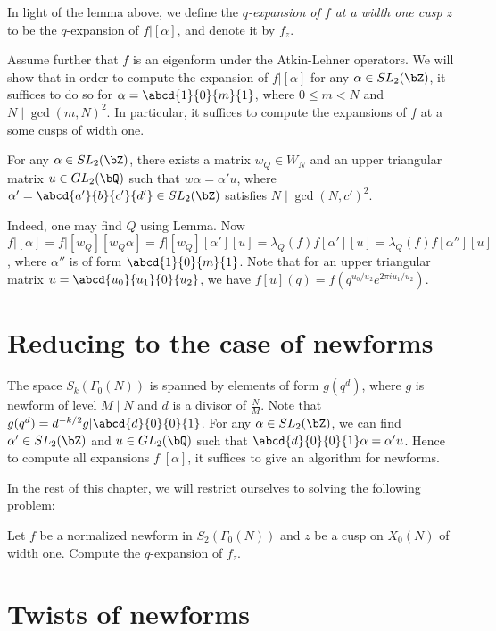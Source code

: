 \documentclass [11pt, proquest] {uwthesis}[2015/03/03]
\begin{document}
In light of the lemma above, we define the {\it $q$-expansion of $f$ at a width one cusp $z$} to be the $q$-expansion of $f | [\alpha]$, and denote it by $f_z$. 


Assume further that $f$ is an eigenform under the Atkin-Lehner operators. We will show that in order to compute the expansion of $f|[\alpha]$ for any $\alpha \in SL_2(\bZ)$, it suffices to do so for $\alpha = \abcd{1}{0}{m}{1}$, where $0 \leq m < N$ and $N \mid \gcd(m,N)^2$. In particular, it suffices to compute the expansions of $f$ at a some cusps of width one.

\begin{Lemma}
For any $\alpha \in SL_2(\bZ)$, there exists a matrix $w_Q \in W_N$ and an upper triangular matrix $u \in GL_2(\bQ)$
such that $w\alpha = \alpha' u$, where $\alpha' = \abcd{a'}{b}{c'}{d'} \in SL_2(\bZ)$ satisfies $N \mid \gcd(N,c')^2$.
\end{Lemma}

Indeed, one may find $Q$ using Lemma. Now $f|[\alpha] = f|[w_Q][w_Q\alpha] = f|[w_Q][\alpha'][u] = \lambda_Q(f) f [\alpha'][u] =\lambda_Q(f) f[\alpha''][u]$, where $\alpha''$ is of form $\abcd{1}{0}{m}{1}$. Note that for an upper triangular matrix $u = \abcd{u_0}{u_1}{0}{u_2}$, we have $f[u](q) = f(q^{u_0/u_2} e^{2\pi i u_1/u_2})$.

\section{Reducing to the case of newforms}

The space $S_k(\Gamma_0(N))$ is spanned by elements of form $g(q^d)$, where $g$ is newform of level $M \mid N$ and $d$ is a divisor of $\frac{N}{M}$.  Note that $g(q^d) = d^{-k/2} g | \abcd{d}{0}{0}{1}$. For any $\alpha \in SL_2(\bZ)$, 
we can find $\alpha' \in SL_2(\bZ)$ and $u \in GL_2(\bQ)$ such that $\abcd{d}{0}{0}{1} \alpha  = \alpha' u$. Hence to compute all expansions $f | [\alpha]$, it suffices to give an algorithm for newforms.

In the rest of this chapter, we will restrict ourselves to solving the following problem: 

\begin{problem}
Let $f$ be a normalized newform in $S_2(\Gamma_0(N))$ and $z$ be a cusp on $X_0(N)$ of width one. Compute the $q$-expansion of $f_z$.
\end{problem}


\section{Twists of newforms}
\end{document}
